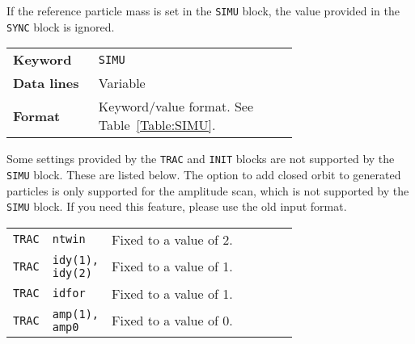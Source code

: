 If the reference particle mass is set in the \texttt{SIMU} block, the value provided in the \texttt{SYNC} block is ignored.

\bigskip
\begin{tabular}{@{}lp{0.7\linewidth}}
    \textbf{Keyword}    & \texttt{SIMU}\index{SIMU} \\
    \textbf{Data lines} & Variable \\
    \textbf{Format}     & Keyword/value format. See Table~\ref{Table:SIMU}.
\end{tabular}

\bigskip
Some settings provided by the \texttt{TRAC} and \texttt{INIT} blocks are not supported by the \texttt{SIMU} block.
These are listed below.
The option to add closed orbit to generated particles is only supported for the amplitude scan, which is not supported by the \texttt{SIMU} block.
If you need this feature, please use the old input format.

\bigskip
\begin{tabular}{@{}llp{0.7\linewidth}}
    \texttt{TRAC} & \texttt{ntwin}          & Fixed to a value of 2.\\
    \texttt{TRAC} & \texttt{idy(1), idy(2)} & Fixed to a value of 1.\\
    \texttt{TRAC} & \texttt{idfor}          & Fixed to a value of 1.\\
    \texttt{TRAC} & \texttt{amp(1), amp0}   & Fixed to a value of 0.\\
\end{tabular}


